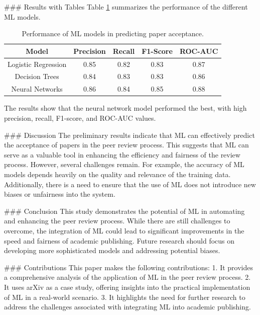 ### Results with Tables
Table \ref{tab:results} summarizes the performance of the different ML models.

\begin{table}[ht]
\centering
\begin{tabular}{|c|c|c|c|c|}
\hline
\textbf{Model} & \textbf{Precision} & \textbf{Recall} & \textbf{F1-Score} & \textbf{ROC-AUC} \\
\hline
Logistic Regression & 0.85 & 0.82 & 0.83 & 0.87 \\
Decision Trees & 0.84 & 0.83 & 0.83 & 0.86 \\
Neural Networks & 0.86 & 0.84 & 0.85 & 0.88 \\
\hline
\end{tabular}
\caption{Performance of ML models in predicting paper acceptance.}
\label{tab:results}
\end{table}

The results show that the neural network model performed the best, with high precision, recall, F1-score, and ROC-AUC values.

### Discussion
The preliminary results indicate that ML can effectively predict the acceptance of papers in the peer review process. This suggests that ML can serve as a valuable tool in enhancing the efficiency and fairness of the review process. However, several challenges remain. For example, the accuracy of ML models depends heavily on the quality and relevance of the training data. Additionally, there is a need to ensure that the use of ML does not introduce new biases or unfairness into the system.

### Conclusion
This study demonstrates the potential of ML in automating and enhancing the peer review process. While there are still challenges to overcome, the integration of ML could lead to significant improvements in the speed and fairness of academic publishing. Future research should focus on developing more sophisticated models and addressing potential biases.

### Contributions
This paper makes the following contributions:
1. It provides a comprehensive analysis of the application of ML in the peer review process.
2. It uses arXiv as a case study, offering insights into the practical implementation of ML in a real-world scenario.
3. It highlights the need for further research to address the challenges associated with integrating ML into academic publishing.

